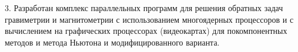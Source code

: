 {	3. Разработан комплекс параллельных программ для решения обратных задач гравиметрии и магнитометрии с использованием многоядерных процессоров и с вычислением на графических процессорах (видеокартах) для покомпонентных методов и метода Ньютона и модифицированного варианта.
%	
%	
%		
%		
}

